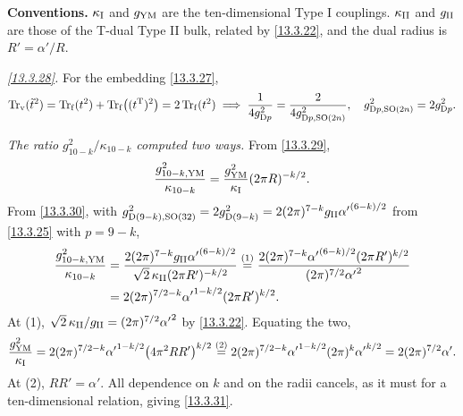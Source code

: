 \begin{tcolorbox}[breakable]
	\begin{remark}
		\textbf{Conventions.} $\kappa_{\rm I}$ and $g_{\rm YM}$ are the ten-dimensional Type I couplings. $\kappa_{\rm II}$ and $g_{\rm II}$ are those of the T-dual Type II bulk, related by \eqref{13.3.22}, and the dual radius is $R'=\alpha'/R$.

		\textit{\eqref{13.3.28}.} For the embedding \eqref{13.3.27},
		\begin{equation*}
			\operatorname{Tr}_{\rm v}(\tilde t^2)=\operatorname{Tr}_{\rm f}(t^2)+\operatorname{Tr}_{\rm f}\bigl((t^{\mathrm T})^2\bigr)=2\operatorname{Tr}_{\rm f}(t^2)
			\;\Longrightarrow\; \frac{1}{4g_{{\rm D}p}^2}=\frac{2}{4g^2_{{\rm D}p,\mathrm{SO}(2n)}},\quad g^2_{{\rm D}p,\mathrm{SO}(2n)}=2g_{{\rm D}p}^2 .
		\end{equation*}

		\textit{The ratio $g^2_{10-k}/\kappa_{10-k}$ computed two ways.} From \eqref{13.3.29},
		\begin{equation*}
			\frac{g^2_{10-k,\rm YM}}{\kappa_{10-k}} = \frac{g_{\rm YM}^2}{\kappa_{\rm I}}(2\pi R)^{-k/2} .
		\end{equation*}
		From \eqref{13.3.30}, with $g^2_{{\rm D}(9-k),\mathrm{SO}(32)}=2g^2_{{\rm D}(9-k)}=2(2\pi)^{7-k}g_{\rm II}{\alpha'}^{(6-k)/2}$ from \eqref{13.3.25} with $p=9-k$,
		\begin{align*}
			\frac{g^2_{10-k,\rm YM}}{\kappa_{10-k}} &= \frac{2(2\pi)^{7-k}g_{\rm II}{\alpha'}^{(6-k)/2}}{\sqrt2\,\kappa_{\rm II}(2\pi R')^{-k/2}}
			\overset{(1)}{=} \frac{2(2\pi)^{7-k}{\alpha'}^{(6-k)/2}(2\pi R')^{k/2}}{(2\pi)^{7/2}{\alpha'}^2}\\
			&= 2(2\pi)^{7/2-k}{\alpha'}^{1-k/2}(2\pi R')^{k/2} .
		\end{align*}
		At (1), $\sqrt2\,\kappa_{\rm II}/g_{\rm II}=(2\pi)^{7/2}{\alpha'}^2$ by \eqref{13.3.22}. Equating the two,
		\begin{align*}
			\frac{g_{\rm YM}^2}{\kappa_{\rm I}} = 2(2\pi)^{7/2-k}{\alpha'}^{1-k/2}\bigl(4\pi^2RR'\bigr)^{k/2} \overset{(2)}{=} 2(2\pi)^{7/2-k}{\alpha'}^{1-k/2}(2\pi)^k{\alpha'}^{k/2} = 2(2\pi)^{7/2}\alpha' .
		\end{align*}
		At (2), $RR'=\alpha'$. All dependence on $k$ and on the radii cancels, as it must for a ten-dimensional relation, giving \eqref{13.3.31}.
	\end{remark}
\end{tcolorbox}

